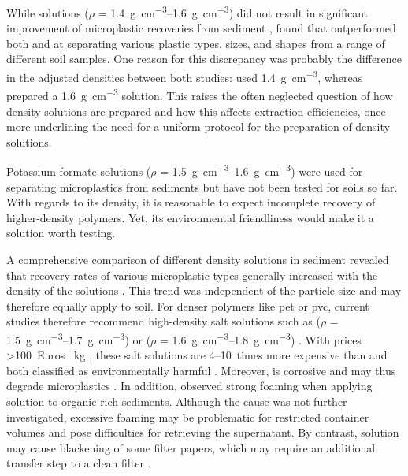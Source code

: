 While  solutions ($\rho$ = \SIrange{1.4}{1.6}{\gram\per\cubic\centi\meter}) did not result in significant improvement of microplastic recoveries from sediment \citep{QuinnValidation2017}, \citet{LiuMethod2019} found that 
outperformed both  and  at separating various plastic types, sizes, and shapes from a range of different soil samples.
One reason for this discrepancy was probably the difference in the adjusted densities between both studies: \citet{QuinnValidation2017} used \SI{1.4}{\gram\per\cubic\centi\meter},
whereas \citet{LiuMethod2019} prepared a \SI{1.6}{\gram\per\cubic\centi\meter} solution. This raises the often neglected question of how density solutions are prepared and how this affects extraction efficiencies, once more underlining the need for a uniform protocol for the preparation of density solutions.

Potassium formate solutions ($\rho$ = \SIrange{1.5}{1.6}{\gram\per\cubic\centi\meter}) were used for separating microplastics from sediments \citep{StockSampling2019,XiongSources2018} but have not been tested for soils so far.
With regards to its density, it is reasonable to expect incomplete recovery of higher-density polymers. Yet, its environmental friendliness \citep{ECHAPotassium2020} would make it a solution worth testing.

A comprehensive comparison of different density solutions in sediment revealed that recovery rates of various microplastic types generally increased with the density of the solutions \citep{QuinnValidation2017}. This trend was independent of the particle size and may therefore equally apply to soil. For denser polymers like \ac{pet}
or \ac{pvc}, current studies therefore recommend high-density salt solutions such as  ($\rho$ = \SIrange{1.5}{1.7}{\gram\per\cubic\centi\meter}) or 
($\rho$ = \SIrange{1.6}{1.8}{\gram\per\cubic\centi\meter}) \citep{MahonMicroplastics2017,HortonLarge2017,ZhangSimple2018}.
With prices \num{>100}~Euros \si{\per\kilo\gram} \citep{CampanalePractical2020}, these salt solutions are
\numrange{4}{10}~times more expensive than  and both classified as environmentally harmful \citep{ECHASodium2020,ECHAZinc2020}. Moreover,  is corrosive and may thus degrade microplastics \citep{HeMicroplastics2018}. In addition, \citet{ZobkovEvaluation2017} observed strong foaming when applying
 solution to organic-rich sediments. Although the cause was not further investigated, excessive foaming may be problematic for restricted container volumes and pose difficulties for retrieving the supernatant. By contrast,  solution may cause blackening of some filter papers, which may require an additional transfer step to a clean filter \citep{QuinnValidation2017}.

